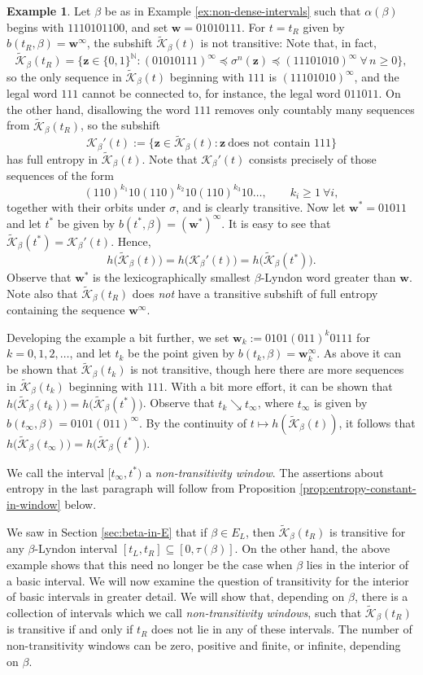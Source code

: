 \documentclass[11pt]{amsart}
\theoremstyle{definition}
\newtheorem{example}[theorem]{Example}
\theoremstyle{remark}
\numberwithin{equation}{section}
\newcommand{\N}{\ensuremath{\mathbb{N}}}
\newcommand{\Kt}{\widetilde{\mathcal{K}}}
\newcommand{\w}{\mathbf{w}}
\newcommand{\z}{\mathbf{z}}
\newcommand{\f}{\infty}
\newcommand{\lle}{\preccurlyeq}
\newcommand{\si}{\sigma}
\begin{document}
\begin{example} \label{ex:non-transitivity-window}
Let $\beta$ be as in Example \ref{ex:non-dense-intervals} such that $\alpha(\beta)$ begins with $1110101100$, and set $\w=01010111$. For $t=t_R$ given by $b(t_R,\beta)=\w^\f$, the subshift $\Kt_\beta(t)$ is not transitive: Note that, in fact,
\[
\Kt_\beta(t_R)=\{\z\in\{0,1\}^\N: (01010111)^\f\lle \si^n(\z)\lle (11101010)^\f\ \forall\,n\geq 0\},
\]
so the only sequence in $\Kt_\beta(t)$ beginning with $111$ is $(11101010)^\f$, and the legal word $111$ cannot be connected to, for instance, the legal word $011011$. On the other hand, disallowing the word $111$ removes only countably many sequences from $\Kt_\beta(t_R)$, so the subshift
\[
\mathcal{K}_\beta'(t):=\{\z\in\Kt_\beta(t): \z\ \mbox{does not contain $111$}\}
\]
has full entropy in $\Kt_\beta(t)$. Note that $\mathcal{K}_\beta'(t)$ consists precisely of those sequences of the form
\[
(110)^{k_1}10(110)^{k_2}10(110)^{k_3}10\dots, \qquad k_i\geq 1\ \forall i,
\]
together with their orbits under $\si$, and is clearly transitive. Now let $\w^*=01011$ and let $t^*$ be given by $b(t^*,\beta)=(\w^*)^\f$. It is easy to see that $\Kt_\beta(t^*)=\mathcal{K}_\beta'(t)$. Hence,
\[
h\big(\Kt_\beta(t)\big)=h\big(\mathcal{K}_\beta'(t)\big)=h\big(\Kt_\beta(t^*)\big).
\]
Observe that $\w^*$ is the lexicographically smallest $\beta$-Lyndon word greater than $\w$. Note also that $\Kt_\beta(t_R)$ does {\em not} have a transitive subshift of full entropy containing the sequence $\w^\f$.

Developing the example a bit further, we set $\w_k:=0101(011)^k0111$ for $k=0,1,2,\dots$, and let $t_k$ be the point given by $b(t_k,\beta)=\w_k^\f$. As above it can be shown that $\Kt_\beta(t_k)$ is not transitive, though here there are more sequences in $\Kt_\beta(t_k)$ beginning with $111$. With a bit more effort, it can be shown that $h\big(\Kt_\beta(t_k)\big)=h\big(\Kt_\beta(t^*)\big)$. Observe that $t_k\searrow t_\f$, where $t_\f$ is given by $b(t_\f,\beta)=0101(011)^\f$. By the continuity of $t\mapsto h(\Kt_\beta(t))$, it follows that $h\big(\Kt_\beta(t_\f)\big)=h\big(\Kt_\beta(t^*)\big)$.

We call the interval $[t_\f,t^*)$ a {\em non-transitivity window}. The assertions about entropy in the last paragraph will follow from Proposition \ref{prop:entropy-constant-in-window} below.
\end{example}

We saw in Section \ref{sec:beta-in-E} that if $\beta\in E_L$, then $\Kt_\beta(t_R)$ is transitive for any $\beta$-Lyndon interval $[t_L,t_R]\subseteq [0,\tau(\beta)]$. On the other hand, the above example shows that this need no longer be the case when $\beta$ lies in the interior of a basic interval. We will now examine the question of transitivity for the interior of basic intervals in greater detail. We will show that, depending on $\beta$, there is a collection of intervals which we call {\em non-transitivity windows}, such that $\Kt_\beta(t_R)$ is transitive if and only if $t_R$ does not lie in any of these intervals. The number of non-transitivity windows can be zero, positive and finite, or infinite, depending on $\beta$.
\end{document}
